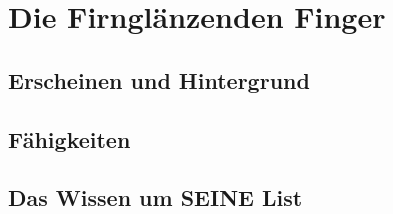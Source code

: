 \section{Die Firnglänzenden Finger}

\subsection{Erscheinen und Hintergrund}

\subsection{Fähigkeiten}


\subsection{Das Wissen um SEINE List}